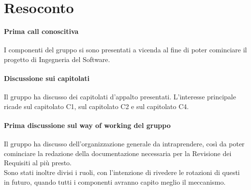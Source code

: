 \documentclass{article}
\begin{document}
\section{Resoconto}%
\label{resoconto}
\paragraph*{Prima call conoscitiva}
I componenti del gruppo si sono presentati a vicenda al fine di poter cominciare il progetto di Ingegneria del Software.

\paragraph*{Discussione sui capitolati}
Il gruppo ha discusso dei capitolati d'appalto presentati. L'interesse principale ricade sul capitolato C1, sul capitolato C2 e sul capitolato C4.

\paragraph*{Prima discussione sul way of working del gruppo}
Il gruppo ha discusso dell'organizzazione generale da intraprendere, così da poter cominciare la redazione della documentazione necessaria per la Revisione dei Requisiti al più presto. \\
Sono stati inoltre divisi i ruoli, con l'intenzione di rivedere le rotazioni di questi in futuro, quando tutti i componenti avranno capito meglio il meccanismo.
\end{document}
